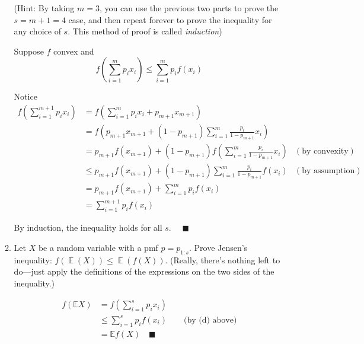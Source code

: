 \documentclass[12pt]{article}
\newcommand{\E}{\mathbb{E}}
\newcommand{\qed}{\quad \blacksquare}
\DeclareMathOperator{\Exp}{\mathbb{E}}
\begin{document}
\begin{enumerate}[1.]
\begin{enumerate}
		            (Hint: By taking $m=3$, you can use the previous two parts to prove the $s=m+1=4$ case, and then repeat forever to prove the inequality for any choice of $s$. This method of proof is called {\em induction})

		            \color{blue}
		            Suppose $f$ convex and
		            \[f\left(\sum_{i=1}^m p_i x_i\right) \leq \sum_{i=1}^m p_i f(x_i)\]

		            Notice
		            \begin{align*}
			            f\left(\sum_{i=1}^{m+1} p_i x_i\right) & = f\left(\sum_{i=1}^m p_i x_i + p_{m+1}x_{m+1}\right)                                                               \\
			                                                   & = f\left(p_{m+1}x_{m+1} + (1 - p_{m+1})\sum_{i=1}^m \frac{p_i}{1 - p_{m+1}} x_i\right)                              \\
			                                                   & = p_{m+1} f(x_{m+1})+ (1 - p_{m+1}) f\left(\sum_{i=1}^m \frac{p_i}{1 - p_{m+1}} x_i\right) & (\text{by convexity})  \\
			                                                   & \leq p_{m+1} f(x_{m+1}) + (1 - p_{m+1})\sum_{i=1}^m \frac{p_i}{1 - p_{m+1}} f(x_i)         & (\text{by assumption}) \\
			                                                   & = p_{m+1} f(x_{m+1} ) + \sum_{i=1}^m p_i f(x_i)                                                                     \\
			                                                   & = \sum_{i=1}^{m+1} p_i f(x_i)
		            \end{align*}

		            By induction, the inequality holds for all $s$. $\qed$
		            \color{black}

		      \item Let $X$ be a random variable with a pmf $p=p_{1:s}$. Prove Jensen's inequality: $f(\Exp(X))\leq \Exp(f(X))$.
		            (Really, there's nothing left to do---just apply the definitions of the expressions on the two sides of the inequality.)

		            \color{blue}
		            \begin{align*}
			            f(\E X) & = f\left(\sum_{i=1}^s p_i x_i\right)                              \\
			                    & \leq \sum_{i=1}^s p_i f(x_i)         \qquad \text{(by (d) above)} \\
			                    & = \E f(X) \qed
		            \end{align*}
		            \color{black}
	      \end{enumerate}


\end{enumerate}
\end{document}
